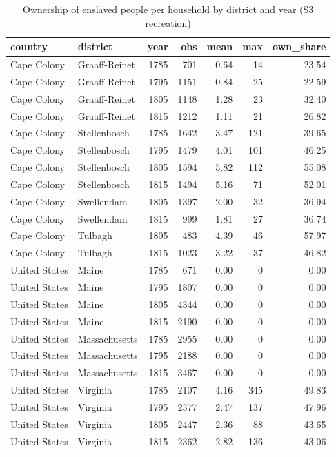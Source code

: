 \begin{table}

\caption{Ownership of enslaved people per household by district and year (S3 recreation)}
\centering
\begin{tabular}[t]{llrrrrr}
\toprule
country & district & year & obs & mean & max & own\_share\\
\midrule
Cape Colony & Graaff-Reinet & 1785 & 701 & 0.64 & 14 & 23.54\\
Cape Colony & Graaff-Reinet & 1795 & 1151 & 0.84 & 25 & 22.59\\
Cape Colony & Graaff-Reinet & 1805 & 1148 & 1.28 & 23 & 32.40\\
Cape Colony & Graaff-Reinet & 1815 & 1212 & 1.11 & 21 & 26.82\\
Cape Colony & Stellenbosch & 1785 & 1642 & 3.47 & 121 & 39.65\\
\addlinespace
Cape Colony & Stellenbosch & 1795 & 1479 & 4.01 & 101 & 46.25\\
Cape Colony & Stellenbosch & 1805 & 1594 & 5.82 & 112 & 55.08\\
Cape Colony & Stellenbosch & 1815 & 1494 & 5.16 & 71 & 52.01\\
Cape Colony & Swellendam & 1805 & 1397 & 2.00 & 32 & 36.94\\
Cape Colony & Swellendam & 1815 & 999 & 1.81 & 27 & 36.74\\
\addlinespace
Cape Colony & Tulbagh & 1805 & 483 & 4.39 & 46 & 57.97\\
Cape Colony & Tulbagh & 1815 & 1023 & 3.22 & 37 & 46.82\\
United States & Maine & 1785 & 671 & 0.00 & 0 & 0.00\\
United States & Maine & 1795 & 1807 & 0.00 & 0 & 0.00\\
United States & Maine & 1805 & 4344 & 0.00 & 0 & 0.00\\
\addlinespace
United States & Maine & 1815 & 2190 & 0.00 & 0 & 0.00\\
United States & Massachusetts & 1785 & 2955 & 0.00 & 0 & 0.00\\
United States & Massachusetts & 1795 & 2188 & 0.00 & 0 & 0.00\\
United States & Massachusetts & 1815 & 3467 & 0.00 & 0 & 0.00\\
United States & Virginia & 1785 & 2107 & 4.16 & 345 & 49.83\\
\addlinespace
United States & Virginia & 1795 & 2377 & 2.47 & 137 & 47.96\\
United States & Virginia & 1805 & 2447 & 2.36 & 88 & 43.65\\
United States & Virginia & 1815 & 2362 & 2.82 & 136 & 43.06\\
\bottomrule
\end{tabular}
\end{table}
